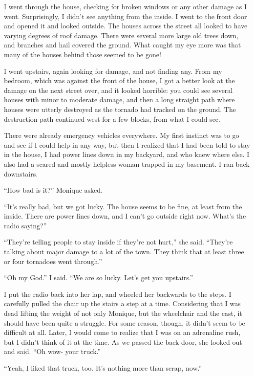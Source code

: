 I went through the house, checking for broken windows or any other damage as I went.
Surprisingly, I didn't see anything from the inside. I went to the front door and opened it and
looked outside. The houses across the street all looked to have varying degrees of roof damage.
There were several more large old trees down, and branches and hail covered the ground. What
caught my eye more was that many of the houses behind those seemed to be gone!

I went upstairs, again looking for damage, and not finding any. From my bedroom, which was
against the front of the house, I got a better look at the damage on the next street over, and
it looked horrible: you could see several houses with minor to moderate damage, and then a long
straight path where houses were utterly destroyed as the tornado had tracked on the ground. The
destruction path continued west for a few blocks, from what I could see.

There were already emergency vehicles everywhere. My first instinct was to go and see if I
could help in any way, but then I realized that I had been told to stay in the house, I had
power lines down in my backyard, and who knew where else. I also had a scared and mostly
helpless woman trapped in my basement. I ran back downstairs.

``How bad is it?'' Monique asked.

``It's really bad, but we got lucky. The house seems to be fine, at least from the inside.
There are power lines down, and I can't go outside right now. What's the radio saying?''

``They're telling people to stay inside if they're not hurt,'' she said. ``They're talking
about major damage to a lot of the town. They think that at least three or four tornadoes went
through.''

``Oh my God.'' I said. ``We are so lucky. Let's get you upstairs.''

I put the radio back into her lap, and wheeled her backwards to the steps. I carefully
pulled the chair up the stairs a step at a time. Considering that I was dead lifting the weight
of not only Monique, but the wheelchair and the cast, it should have been quite a struggle. For
some reason, though, it didn't seem to be difficult at all. Later, I would come to realize that
I was on an adrenaline rush, but I didn't think of it at the time. As we passed the back door,
she looked out and said. ``Oh wow- your truck.''

``Yeah, I liked that truck, too. It's nothing more than scrap, now.''


